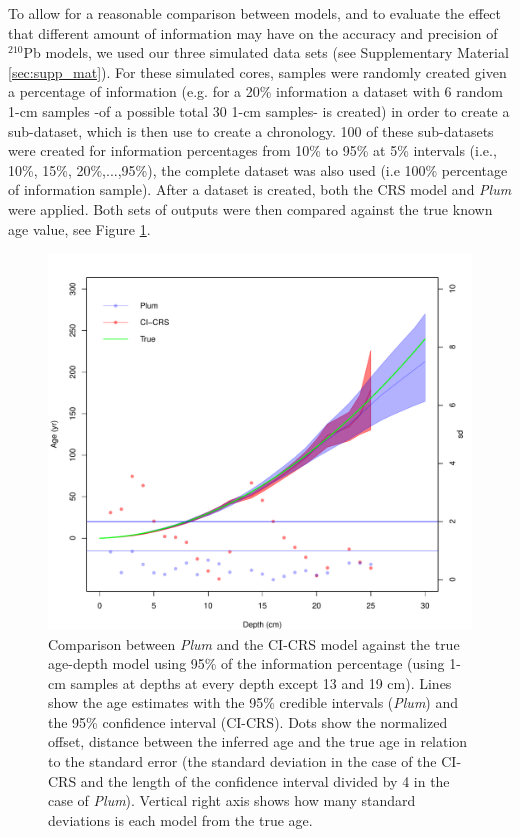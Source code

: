 \documentclass [10pt] {article}
\begin{document}
To allow for a reasonable comparison between models, and to evaluate the effect that different amount of information may have on the accuracy and precision of $^{210}$Pb models, we used our three simulated data sets (see Supplementary Material \ref{sec:supp_mat}). 
For these simulated cores, samples were randomly created given a percentage of information (e.g. for a 20\% information a dataset with 6 random 1-cm samples -of a possible total 30 1-cm samples- is created) in order to create a sub-dataset, which is then use to create a chronology. 
100 of these sub-datasets were created for information percentages from 10\% to 95\% at 5\% intervals (i.e., 10\%, 15\%, 20\%,...,95\%), the complete dataset was also used (i.e 100\% percentage of information sample).
After a dataset is created, both the CRS model and \textit{Plum} were applied.  
Both sets of outputs were then compared against the true known age value, see Figure \ref{fig:comparison1r}.

\begin{figure}[!]
	\begin{centering}
		\includegraphics[width=\linewidth]{comparison1.pdf}
		\caption{Comparison between \textit{Plum} and the CI-CRS model against the true age-depth model using 95\% of the information percentage (using 1-cm samples at depths at every depth except 13 and 19 cm). Lines show the age estimates with the 95\% credible intervals (\textit{Plum}) and the 95\% confidence interval (CI-CRS). Dots show the normalized offset, distance between the inferred age and the true age in relation to the standard error (the standard deviation in the case of the CI-CRS and the length of the confidence interval divided by 4 in the case of \textit{Plum}). Vertical right axis shows how many standard deviations is each model from the true age.  }
		\label{fig:comparison1r}
	\end{centering}
\end{figure}
\end{document}

